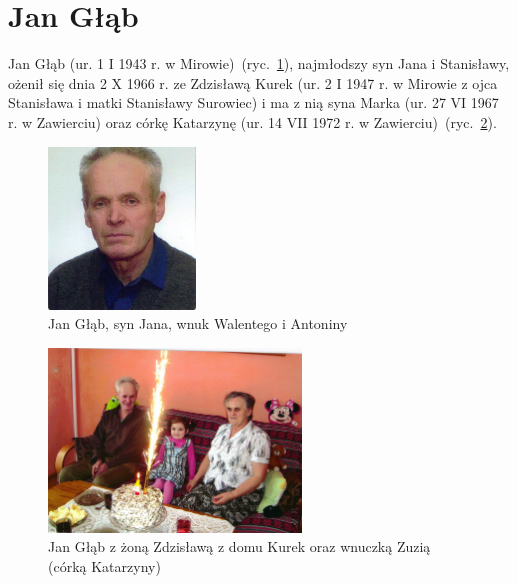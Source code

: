 \section{Jan Głąb}

Jan Głąb (ur. 1 I 1943 r. w Mirowie)~(ryc.~\ref{rys:jan_glab_junior}), najmłodszy syn Jana i Stanisławy, ożenił się dnia 2 X 1966 r. ze Zdzisławą Kurek (ur. 2 I 1947 r. w Mirowie z ojca Stanisława i matki Stanisławy Surowiec) i ma z nią syna Marka (ur. 27 VI 1967 r. w Zawierciu) oraz córkę Katarzynę (ur. 14 VII 1972 r. w Zawierciu)~(ryc.~\ref{rys:jan_i_zdzislawa_glabowie}).

\begin{figure}[!h]
\begin{center}
\includegraphics[width=0.35\textwidth]{zdjecia/jan_glab_junior.jpg}
\caption[Jan Głąb]{Jan Głąb, syn Jana, wnuk Walentego i Antoniny}
\label{rys:jan_glab_junior}
\end{center}
\end{figure}

\begin{figure}[!h]
\begin{center}
\includegraphics[width=0.6\textwidth]{zdjecia/jan_i_zdzislawa_glabowie.jpg}
\caption[Jan Głąb z żoną Zdzisławą z domu Kurek oraz wnuczką Zuzią]{Jan Głąb z żoną Zdzisławą z domu Kurek oraz wnuczką Zuzią (córką Katarzyny)}
\label{rys:jan_i_zdzislawa_glabowie}
\end{center}
\end{figure}

